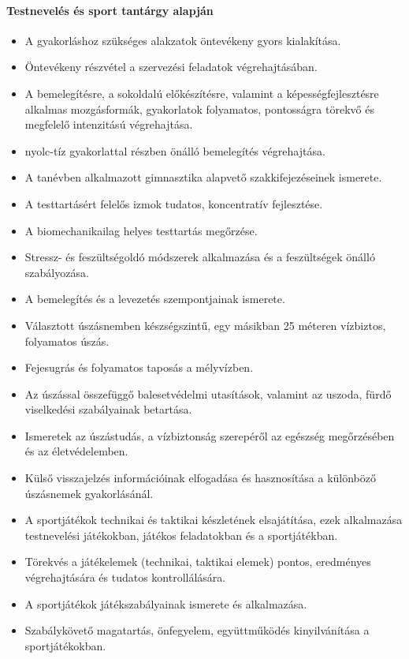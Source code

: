 \paragraph{Testnevelés és sport tantárgy alapján}
\begin{itemize}
\item A gyakorláshoz szükséges alakzatok öntevékeny gyors kialakítása.
\item Öntevékeny részvétel a szervezési feladatok végrehajtásában.
\item A bemelegítésre, a sokoldalú előkészítésre, valamint a képességfejlesztésre alkalmas mozgásformák, gyakorlatok folyamatos, pontosságra törekvő és megfelelő intenzitású végrehajtása.
\item nyolc-tíz gyakorlattal részben önálló bemelegítés végrehajtása.
\item A tanévben alkalmazott gimnasztika alapvető szakkifejezéseinek ismerete.
\item A testtartásért felelős izmok tudatos, koncentratív fejlesztése.
\item A biomechanikailag helyes testtartás megőrzése.
\item Stressz- és feszültségoldó módszerek alkalmazása és a feszültségek önálló szabályozása.
\item A bemelegítés és a levezetés szempontjainak ismerete.
\item Választott úszásnemben készségszintű, egy másikban 25 méteren vízbiztos, folyamatos úszás.
\item Fejesugrás és folyamatos taposás a mélyvízben.
\item Az úszással összefüggő balesetvédelmi utasítások, valamint az uszoda, fürdő viselkedési szabályainak betartása.
\item Ismeretek az úszástudás, a vízbiztonság szerepéről az egészség megőrzésében és az életvédelemben.
\item Külső visszajelzés információinak elfogadása és hasznosítása a különböző úszásnemek gyakorlásánál.
\item A sportjátékok technikai és taktikai készletének elsajátítása, ezek alkalmazása testnevelési játékokban, játékos feladatokban és a sportjátékban.
\item Törekvés a játékelemek (technikai, taktikai elemek) pontos, eredményes végrehajtására és tudatos kontrollálására.
\item A sportjátékok játékszabályainak ismerete és alkalmazása.
\item Szabálykövető magatartás, önfegyelem, együttműködés kinyilvánítása a sportjátékokban.

\end{itemize}
